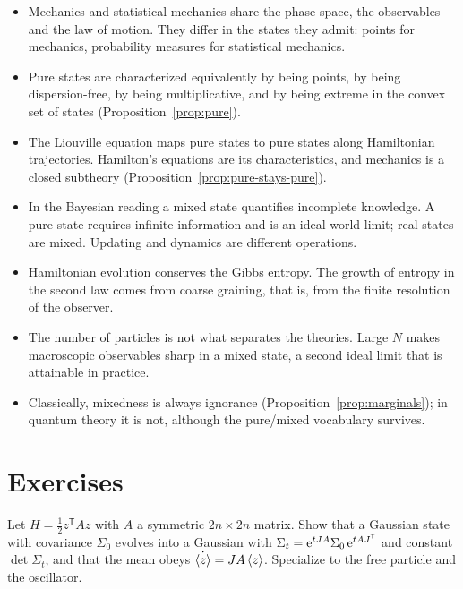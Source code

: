 \begin{itemize}[nosep]
\item Mechanics and statistical mechanics share the phase space, the observables and the law of motion. They differ in the states they admit: points for mechanics, probability measures for statistical mechanics.
\item Pure states are characterized equivalently by being points, by being dispersion-free, by being multiplicative, and by being extreme in the convex set of states (Proposition~\ref{prop:pure}).
\item The Liouville equation maps pure states to pure states along Hamiltonian trajectories. Hamilton's equations are its characteristics, and mechanics is a closed subtheory (Proposition~\ref{prop:pure-stays-pure}).
\item In the Bayesian reading a mixed state quantifies incomplete knowledge. A pure state requires infinite information and is an ideal-world limit; real states are mixed. Updating and dynamics are different operations.
\item Hamiltonian evolution conserves the Gibbs entropy. The growth of entropy in the second law comes from coarse graining, that is, from the finite resolution of the observer.
\item The number of particles is not what separates the theories. Large $N$ makes macroscopic observables sharp in a mixed state, a second ideal limit that is attainable in practice.
\item Classically, mixedness is always ignorance (Proposition~\ref{prop:marginals}); in quantum theory it is not, although the pure/mixed vocabulary survives.
\end{itemize}

\section*{Exercises}

\begin{exercise}
Let $H=\tfrac12 z^{\mathsf T}Az$ with $A$ a symmetric $2n\times2n$ matrix. Show that a Gaussian state with covariance $\Sigma_0$ evolves into a Gaussian with $\Sigma_t=\mathrm{e}^{tJA}\Sigma_0\,\mathrm{e}^{tA J^{\mathsf T}}$ and constant $\det\Sigma_t$, and that the mean obeys $\dot{\left\langle z\right\rangle}=JA\left\langle z\right\rangle$. Specialize to the free particle and the oscillator.
\end{exercise}

